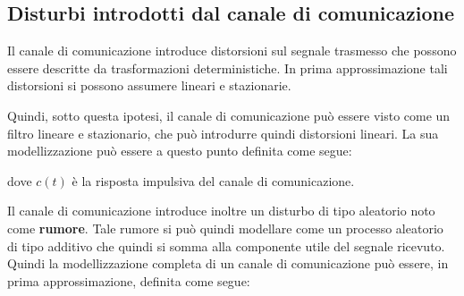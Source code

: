 
\subsection*{
    Disturbi introdotti dal canale di comunicazione
}
Il canale di comunicazione introduce distorsioni sul segnale trasmesso che possono essere descritte da trasformazioni deterministiche. In prima approssimazione tali distorsioni si possono assumere lineari e stazionarie.


Quindi, sotto questa ipotesi, il canale di comunicazione può essere visto come un filtro lineare e stazionario, che può introdurre quindi distorsioni lineari. La sua modellizzazione può essere a questo punto definita come segue:
\begin{center}
\end{center}


dove \( c(t) \) è la risposta impulsiva del canale di comunicazione.

\bigskip
Il canale di comunicazione introduce inoltre un disturbo di tipo aleatorio noto come \textbf{rumore}. Tale rumore si può quindi modellare come un processo aleatorio di tipo additivo che quindi si somma alla componente utile del segnale ricevuto.
Quindi la modellizzazione completa di un canale di comunicazione può essere, in prima approssimazione, definita come segue:

\begin{center}
\end{center}

